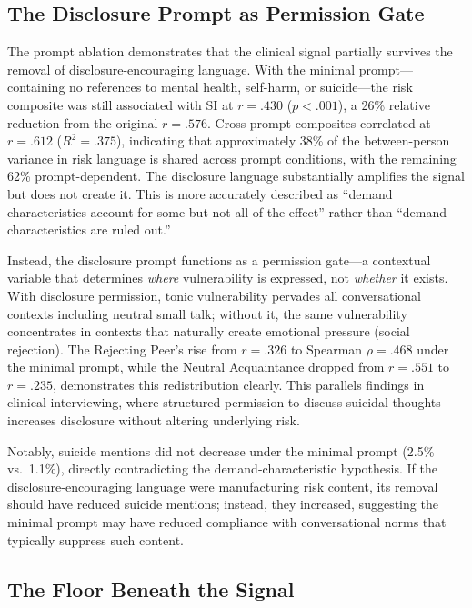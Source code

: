 \documentclass[review,12pt,authoryear]{elsarticle}
\begin{document}
\subsection{The Disclosure Prompt as Permission Gate}

The prompt ablation demonstrates that the clinical signal partially survives the removal of disclosure-encouraging language. With the minimal prompt---containing no references to mental health, self-harm, or suicide---the risk composite was still associated with SI at $r = .430$ ($p < .001$), a 26\% relative reduction from the original $r = .576$. Cross-prompt composites correlated at $r = .612$ ($R^2 = .375$), indicating that approximately 38\% of the between-person variance in risk language is shared across prompt conditions, with the remaining 62\% prompt-dependent. The disclosure language substantially amplifies the signal but does not create it. This is more accurately described as ``demand characteristics account for some but not all of the effect'' rather than ``demand characteristics are ruled out.''

Instead, the disclosure prompt functions as a permission gate---a contextual variable that determines \textit{where} vulnerability is expressed, not \textit{whether} it exists. With disclosure permission, tonic vulnerability pervades all conversational contexts including neutral small talk; without it, the same vulnerability concentrates in contexts that naturally create emotional pressure (social rejection). The Rejecting Peer's rise from $r = .326$ to Spearman $\rho = .468$ under the minimal prompt, while the Neutral Acquaintance dropped from $r = .551$ to $r = .235$, demonstrates this redistribution clearly. This parallels findings in clinical interviewing, where structured permission to discuss suicidal thoughts increases disclosure without altering underlying risk.

Notably, suicide mentions did not decrease under the minimal prompt (2.5\% vs.\ 1.1\%), directly contradicting the demand-characteristic hypothesis. If the disclosure-encouraging language were manufacturing risk content, its removal should have reduced suicide mentions; instead, they increased, suggesting the minimal prompt may have reduced compliance with conversational norms that typically suppress such content.

\subsection{The Floor Beneath the Signal}
\end{document}
